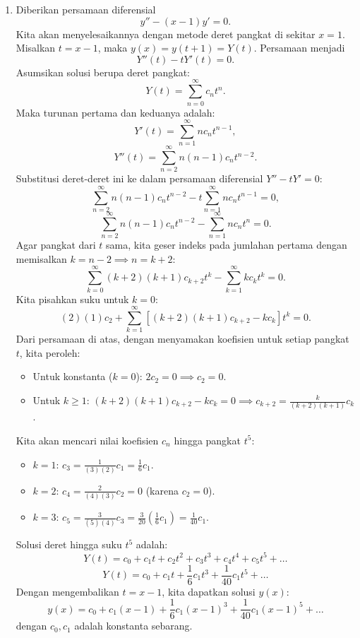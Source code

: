 \documentclass[12pt,openany,a4paper]{article}
\begin{document}
\begin{enumerate}
  \item Diberikan persamaan diferensial
        \[y'' - (x - 1)y' = 0.\]
        Kita akan menyelesaikannya dengan metode deret pangkat di sekitar $x = 1$.
        Misalkan $t = x - 1$, maka $y(x) = y(t+1) = Y(t)$. Persamaan menjadi
        \[Y''(t) - tY'(t) = 0.\]
        Asumsikan solusi berupa deret pangkat:
        \[Y(t) = \sum_{n=0}^{\infty} c_n t^n.\]
        Maka turunan pertama dan keduanya adalah:
        \[Y'(t) = \sum_{n=1}^{\infty} n c_n t^{n-1},\]
        \[Y''(t) = \sum_{n=2}^{\infty} n(n-1) c_n t^{n-2}.\]
        Substitusi deret-deret ini ke dalam persamaan diferensial $Y'' - tY' = 0$:
        \[\sum_{n=2}^{\infty} n(n-1) c_n t^{n-2} - t\sum_{n=1}^{\infty} n c_n t^{n-1} = 0,\]
        \[\sum_{n=2}^{\infty} n(n-1) c_n t^{n-2} - \sum_{n=1}^{\infty} n c_n t^n = 0.\]
        Agar pangkat dari $t$ sama, kita geser indeks pada jumlahan pertama dengan memisalkan $k = n-2 \implies n = k+2$:
        \[\sum_{k=0}^{\infty} (k+2)(k+1) c_{k+2} t^k - \sum_{k=1}^{\infty} k c_k t^k = 0.\]
        Kita pisahkan suku untuk $k=0$:
        \[(2)(1) c_2 + \sum_{k=1}^{\infty} \left[ (k+2)(k+1) c_{k+2} - k c_k \right] t^k = 0.\]
        Dari persamaan di atas, dengan menyamakan koefisien untuk setiap pangkat $t$, kita peroleh:
        \begin{itemize}
          \item Untuk konstanta ($k=0$): $2 c_2 = 0 \implies c_2 = 0$.
          \item Untuk $k \ge 1$: $(k+2)(k+1) c_{k+2} - k c_k = 0 \implies c_{k+2} = \frac{k}{(k+2)(k+1)} c_k$.
        \end{itemize}
        Kita akan mencari nilai koefisien $c_n$ hingga pangkat $t^5$:
        \begin{itemize}
          \item $k = 1$: $c_3 = \frac{1}{(3)(2)} c_1 = \frac{1}{6} c_1$.
          \item $k = 2$: $c_4 = \frac{2}{(4)(3)} c_2 = 0$ (karena $c_2 = 0$).
          \item $k = 3$: $c_5 = \frac{3}{(5)(4)} c_3 = \frac{3}{20} \left(\frac{1}{6} c_1\right) = \frac{1}{40} c_1$.
        \end{itemize}
        Solusi deret hingga suku $t^5$ adalah:
        \[Y(t) = c_0 + c_1 t + c_2 t^2 + c_3 t^3 + c_4 t^4 + c_5 t^5 + \dots\]
        \[Y(t) = c_0 + c_1 t + \frac{1}{6} c_1 t^3 + \frac{1}{40} c_1 t^5 + \dots\]
        Dengan mengembalikan $t = x - 1$, kita dapatkan solusi $y(x)$:
        \[y(x) = c_0 + c_1 (x-1) + \frac{1}{6} c_1 (x-1)^3 + \frac{1}{40} c_1 (x-1)^5 + \dots\]
        dengan $c_0, c_1$ adalah konstanta sebarang.


\end{enumerate}
\end{document}
